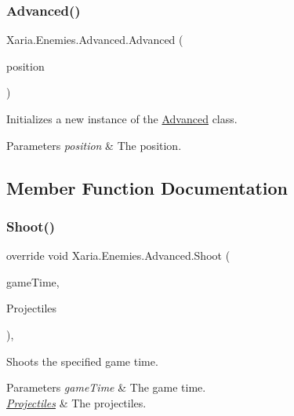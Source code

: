 \subsubsection{\texorpdfstring{Advanced()}{Advanced()}}
{\footnotesize\ttfamily Xaria.\+Enemies.\+Advanced.\+Advanced (\begin{DoxyParamCaption}\item[{Vector2}]{position }\end{DoxyParamCaption})\hspace{0.3cm}{\ttfamily [inline]}}



Initializes a new instance of the \hyperlink{classXaria_1_1Enemies_1_1Advanced}{Advanced} class. 


\begin{DoxyParams}{Parameters}
{\em position} & The position.\\
\hline
\end{DoxyParams}


\subsection{Member Function Documentation}
\mbox{\label{classXaria_1_1Enemies_1_1Advanced_af838890dc217792b449a18a266e5518b}} 
\subsubsection{\texorpdfstring{Shoot()}{Shoot()}}
{\footnotesize\ttfamily override void Xaria.\+Enemies.\+Advanced.\+Shoot (\begin{DoxyParamCaption}\item[{Game\+Time}]{game\+Time,  }\item[{ref List$<$ \hyperlink{classXaria_1_1Projectile}{Projectile} $>$}]{Projectiles }\end{DoxyParamCaption})\hspace{0.3cm}{\ttfamily [inline]}, {\ttfamily [virtual]}}



Shoots the specified game time. 


\begin{DoxyParams}{Parameters}
{\em game\+Time} & The game time.\\
\hline
{\em \hyperlink{namespaceXaria_1_1Projectiles}{Projectiles}} & The projectiles.\\
\hline
\end{DoxyParams}


